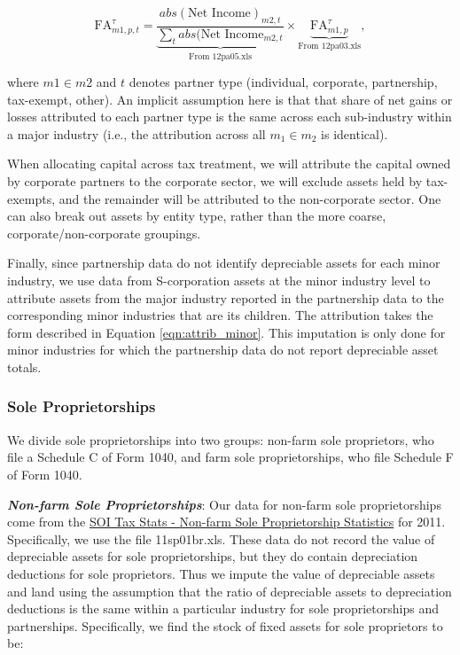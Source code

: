 \documentclass[article,11pt,letterpaper,fleqn]{article}
\theoremstyle{definition}
\numberwithin{equation}{section}
\begin{document}
\begin{equation}
\text{FA}^{\tau}_{m1,p,t}=  \underbrace{\frac{abs(\text{Net Income})_{m2,t}}{\sum_{t}abs(\text{Net Income}_{m2,t}}}_{\text{From 12pa05.xls}} \times \underbrace{\text{FA}^{\tau}_{m1,p}}_{\text{From 12pa03.xls}},
\end{equation}

\noindent\noindent where $m1\in m2$ and $t$ denotes partner type (individual, corporate, partnership, tax-exempt, other).  An implicit assumption here is that that share of net gains or losses attributed to each partner type is the same across each sub-industry within a major industry (i.e., the attribution across all $m_{1}\in m_{2}$ is identical).

When allocating capital across tax treatment, we will attribute the capital owned by corporate partners to the corporate sector, we will exclude assets held by tax-exempts, and the remainder will be attributed to the non-corporate sector.  One can also break out assets by entity type, rather than the more coarse, corporate/non-corporate groupings.

Finally, since partnership data do not identify depreciable assets for each minor industry, we use data from S-corporation assets at the minor industry level to attribute assets from the major industry reported in the partnership data to the corresponding minor industries that are its children.  The attribution takes the form described in Equation \ref{eqn:attrib_minor}.  This imputation is only done for minor industries for which the partnership data do not report depreciable asset totals.  


\subsubsection{Sole Proprietorships}

We divide sole proprietorships into two groups: non-farm sole proprietors, who file a Schedule C of Form 1040, and farm sole proprietorships, who file Schedule F of Form 1040.  

\textbf{\emph{Non-farm Sole Proprietorships}}:  Our data for non-farm sole proprietorships come from the \href{http://www.irs.gov/uac/SOI-Tax-Stats-Nonfarm-Sole-Proprietorship-Statistics}{SOI Tax Stats - Non-farm Sole Proprietorship Statistics} for 2011.  Specifically, we use the file 11sp01br.xls.  These data do not record the value of depreciable assets for sole proprietorships, but they do contain depreciation deductions for sole proprietors.  Thus we impute the value of depreciable assets and land using the assumption that the ratio of depreciable assets to depreciation deductions is the same within a particular industry for sole proprietorships and partnerships.  Specifically, we find the stock of fixed assets for sole proprietors to be: 
\end{document}
